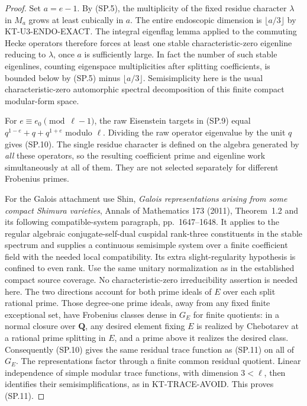\documentclass[11pt,a4paper]{article}
\theoremstyle{definition}
\begin{document}
\begin{proof}
Set $a=e-1$. By (SP.5), the multiplicity of the fixed
residue character $\lambda$ in $M_a$ grows at least
cubically in $a$. The entire endoscopic dimension is
$\lfloor a/3\rfloor$ by KT-U3-ENDO-EXACT. The integral
eigenflag lemma applied to the commuting Hecke operators
therefore forces at least one stable characteristic-zero
eigenline reducing to $\lambda$, once $a$ is sufficiently
large. In fact the number of such stable eigenlines,
counting eigenspace multiplicities after splitting
coefficients, is bounded below by (SP.5) minus
$\lfloor a/3\rfloor$. Semisimplicity here is the usual
characteristic-zero automorphic spectral decomposition
of this finite compact modular-form space.

For $e\equiv e_0\pmod{\ell-1}$, the raw Eisenstein targets
in (SP.9) equal $q^{1-e}+q+q^{1+e}$ modulo $\ell$.
Dividing the raw operator eigenvalue by the unit $q$
gives (SP.10). The single residue character is defined
on the algebra generated by \emph{all} these operators,
so the resulting coefficient prime and eigenline work
simultaneously at all of them. They are not selected
separately for different Frobenius primes.

For the Galois attachment use Shin, \emph{Galois representations
arising from some compact Shimura varieties}, Annals of
Mathematics 173 (2011), Theorem~1.2 and its following
compatible-system paragraph, pp.~1647--1648. It applies to
the regular algebraic conjugate-self-dual cuspidal
rank-three constituents in the stable spectrum and supplies
a continuous semisimple system over a finite coefficient
field with the needed local compatibility. Its extra
slight-regularity hypothesis is confined to even rank.
Use the same unitary normalization as in the established
compact source coverage. No characteristic-zero
irreducibility assertion is needed here. The two
directions account for both prime ideals of $E$ over
each split rational prime. Those degree-one prime ideals,
away from any fixed finite exceptional set, have Frobenius
classes dense in $G_E$ for finite quotients: in a normal
closure over $\mathbf Q$, any desired element fixing $E$
is realized by Chebotarev at a rational prime splitting
in $E$, and a prime above it realizes the desired class.
Consequently (SP.10) gives the same residual trace function
as (SP.11) on all of $G_E$. The representations factor
through a finite common residual quotient. Linear
independence of simple modular trace functions, with
dimension $3<\ell$, then identifies their semisimplifications,
as in KT-TRACE-AVOID. This proves (SP.11).
\end{proof}
\end{document}
